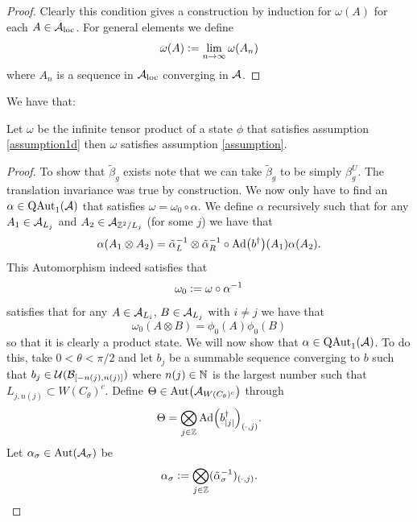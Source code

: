 \documentclass[12pt,a4paper,twoside]{article}
\numberwithin{equation}{section}
\begin{document}
\begin{proof}
	Clearly this condition gives a construction by induction for $\omega(A)$ for each $A\in\AA_{\text{loc}}$. For general elements we define
	\begin{equation}
		\omega(A)\defeq \lim_{n\rightarrow\infty}\omega(A_n)
	\end{equation}
	where $A_n$ is a sequence in $\AA_{\text{loc}}$ converging in $\AA$.
\end{proof}
We have that:
\begin{lemma}\label{lem:TensorProductStateHasWellDefinedH^2Index}
	Let $\omega$ be the infinite tensor product of a state $\phi$ that satisfies assumption \ref{assumption1d} then $\omega$ satisfies assumption \ref{assumption}.
\end{lemma}
\begin{proof}
	To show that $\tilde{\beta}_g$ exists note that we can take $\tilde{\beta}_g$ to be simply $\beta_g^{U}$. The translation invariance was true by construction. We now only have to find an $\alpha\in\QAut{\AA}$ that satisfies $\omega=\omega_0\circ\alpha$. We define $\alpha$ recursively such that for any $A_{1}\in\AA_{L_j}$ and $A_{2}\in\AA_{\ZZ^2/L_j}$ (for some $j$) we have that
	\begin{equation}
		\alpha(A_1\otimes A_2)=\tilde{\alpha}_L^{-1}\otimes\tilde{\alpha}_R^{-1}\circ\Ad{b^\dagger}(A_1)\alpha(A_2).
	\end{equation}
	This Automorphism indeed satisfies that
	\begin{equation}
		\omega_0\defeq \omega\circ\alpha^{-1}
	\end{equation}
	satisfies that for any $A\in\AA_{L_{i}}$, $B\in\AA_{L_{j}}$ with $i\neq j$ we have that
	\begin{equation}
		\omega_0(A\otimes B)=\phi_0(A)\phi_0(B)
	\end{equation}
	so that it is clearly a product state. We will now show that $\alpha\in\QAut{\AA}$. To do this, take $0<\theta<\pi/2$ and let $b_j$ be a summable sequence converging to $b$ such that $b_j\in\UU(\BB_{[-n(j),n(j)]})$ where $n(j)\in\NN$ is the largest number such that $L_{j,n(j)}\subset W(C_\theta)^c$. Define $\Theta\in\Aut{\AA_{W(C_\theta)^c}}$ through
	\begin{equation}
		\Theta=\bigotimes_{j\in\ZZ}\Ad{b_\abs{j}^\dagger}_{(\cdot,j)}.
	\end{equation}
	Let $\alpha_\sigma\in\Aut{\AA_\sigma}$ be
	\begin{equation}
		\alpha_\sigma\defeq \bigotimes_{j\in\ZZ}(\tilde\alpha_\sigma^{-1})_{(\cdot,j)}.

\end{equation}
\end{proof}
\end{document}
